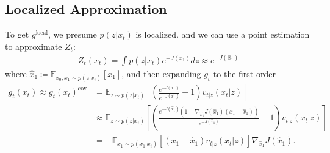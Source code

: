 \subsection{Localized Approximation}
\label{app:localized_approximation}

To get $g^{\text{local}}$, we presume $p(z|x_t)$ is localized, and we can use a point estimation to approximate $Z_t$:
\begin{align}
Z_t(x_t) = \int p(z|x_t) e^{-J(x_1)} dz  
\approx e^{-J(\hat{x}_1)}
\end{align}
where $\hat{x}_1 \coloneqq \mathbb{E}_{x_0,x_1\sim p(z|x_t)}[x_1]$,
and then expanding $g_t$ to the first order
\begin{align}\nonumber
    g_t(x_t) \approx g_t(x_t)^{\text{cov}} &= \mathbb{E}_{z \sim p(z|x_t)} 
    \left[
    (\frac{e^{-J(x_1)}}{e^{-J(\hat{x}_1)}} - 1)v_{t|z}(x_t|z)
    \right] \\
    \nonumber &\approx \mathbb{E}_{z \sim p(z|x_t)} \left[
    (\frac{e^{-J(\hat{x}_1)}(1 - \nabla_{\hat{x}_1} J(\hat{x}_1) (x_1 - \hat{x}_1))}{e^{-J(\hat{x}_1)}} - 1)v_{t|z}(x_t|z)
    \right] \\
    &= -\mathbb{E}_{x_1 \sim p(x_1|x_t)}
    \left[
     (x_1 - \hat{x}_1)v_{t|z}(x_t|z)
    \right] \nabla_{\hat{x}_1} J(\hat{x}_1).
\end{align}




